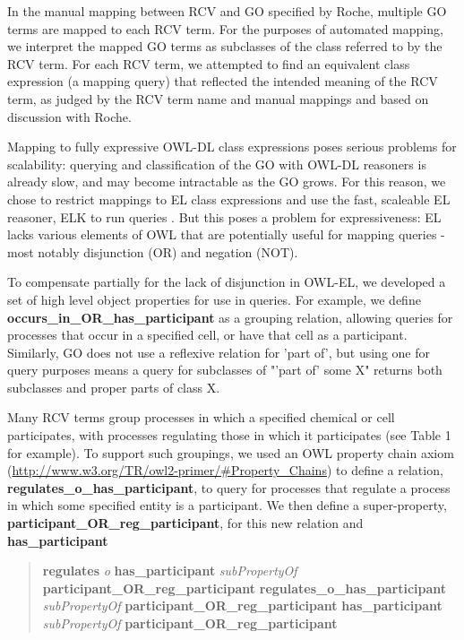 \documentclass[runningheads,a4paper]{llncs}
\begin{document}
{{In the manual mapping between RCV and \ac{GO} specified by Roche, multiple \ac{GO} terms are mapped to each RCV term. For the purposes of automated mapping, we interpret the mapped \ac{GO} terms as subclasses of the class referred to by the RCV term. For each RCV term, we attempted to find an equivalent class expression (a mapping query) that reflected the intended meaning of the RCV term, as judged by the RCV term name and manual mappings and based on discussion with Roche.

Mapping to fully expressive OWL-DL class expressions poses serious problems for scalability: querying and classification of the \ac{GO} with OWL-DL reasoners is already slow, and may become intractable as the \ac{GO} grows.  For this reason, we chose to restrict mappings to EL class expressions and use the fast, scaleable EL reasoner, ELK to run queries \cite{kazakov2012}. But this poses a problem for expressiveness: EL lacks various elements of OWL that are potentially useful for mapping queries - most notably disjunction (OR) and negation (NOT).  

To compensate partially for the lack of disjunction in OWL-EL, we developed a set of high level object properties for use in queries. For example, we define \textbf{occurs\_in\_OR\_has\_participant} as a grouping relation, allowing queries for processes that occur in a specified cell, or have that cell as a participant. Similarly, \ac{GO} does not use a reflexive relation for 'part of', but using one for query purposes means a query for subclasses of  "'part of' some X" returns both subclasses and proper parts of class X.

Many RCV terms group processes in which a specified chemical or cell participates, with processes regulating those in which it participates (see Table 1 for example). To support such groupings, we used an OWL property chain axiom (\url{http://www.w3.org/TR/owl2-primer/#Property_Chains}) to define a relation, \textbf{regulates\_o\_has\_participant}, to query for processes that regulate a process in which some specified entity is a participant. We then define a super-property, \textbf{participant\_OR\_reg\_participant}, for this new relation and \textbf{has\_participant}

\begin{quote} %
\textbf{regulates} \textit{o} \textbf{has\_participant} \textit{subPropertyOf}
\textbf{participant\_OR\_reg\_participant}
\textbf{regulates\_o\_has\_participant} \textit{subPropertyOf} \textbf{participant\_OR\_reg\_participant}
\textbf{has\_participant} \textit{subPropertyOf} \textbf{participant\_OR\_reg\_participant}
\end{quote}

}}
\end{document}
